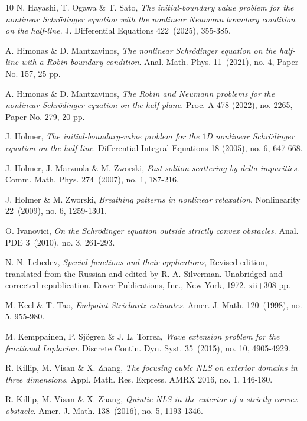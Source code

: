 \documentclass[11pt,letter]{amsart}
\numberwithin{equation}{section}
\numberwithin{equation}{section}
\begin{document}
\begin{thebibliography}{10}
N. Hayashi, T. Ogawa \& T. Sato, \emph{The initial-boundary value problem for the nonlinear Schr\"odinger equation with the nonlinear Neumann boundary condition on the half-line}.
J. Differential Equations 422~(2025), 355-385.

A. Himonas \& D.  Mantzavinos, \emph{The nonlinear Schr\"odinger equation on the half-line with a Robin boundary condition}.
Anal. Math. Phys. 11~(2021), no. 4, Paper No. 157, 25 pp.


A. Himonas \& D.  Mantzavinos, \emph{The Robin and Neumann problems for the nonlinear Schr\"odinger equation on the half-plane}.
Proc. A 478 (2022), no. 2265, Paper No. 279, 20 pp.

J. Holmer, \emph{
The initial-boundary-value problem for the $1$D nonlinear Schr\"odinger equation on the half-line}.
Differential Integral Equations 18 (2005), no. 6, 647-668.

J. Holmer, J. Marzuola \& M. Zworski, \emph{
Fast soliton scattering by delta impurities}.
Comm. Math. Phys. 274~(2007), no. 1, 187-216.

J. Holmer \& M. Zworski, 
\emph{Breathing patterns in nonlinear relaxation}.
Nonlinearity 22~(2009), no. 6, 1259-1301.

O. Ivanovici, \emph{
On the Schr\"odinger equation outside strictly convex obstacles}.
Anal. PDE 3~(2010), no. 3, 261-293.


N. N. Lebedev, \emph{Special functions and their applications}, Revised edition, translated from the Russian and edited by R. A. Silverman. Unabridged and corrected republication. Dover Publications, Inc., New York, 1972. xii+308 pp.

M. Keel \& T. Tao, \emph{
Endpoint Strichartz estimates}.
Amer. J. Math. 120~(1998), no. 5, 955-980.

M. Kemppainen, P. Sj\"ogren \& J. L.  Torrea, \emph{
Wave extension problem for the fractional Laplacian}.
Discrete Contin. Dyn. Syst. 35~(2015), no. 10, 4905-4929.


R. Killip, M. Visan \& X. Zhang, \emph{
The focusing cubic NLS on exterior domains in three dimensions}.
Appl. Math. Res. Express. AMRX 2016, no. 1, 146-180.

R. Killip, M. Visan \& X. Zhang, \emph{ Quintic NLS in the exterior of a strictly convex obstacle}.
Amer. J. Math. 138~(2016), no. 5, 1193-1346.


\end{thebibliography}
\end{document}
